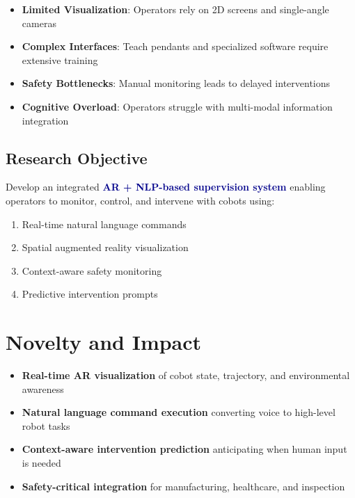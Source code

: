 \documentclass[12pt,a4paper,oneside]{book}
\begin{document}
\begin{itemize}
    \item \textbf{Limited Visualization}: Operators rely on 2D screens and single-angle cameras
    \item \textbf{Complex Interfaces}: Teach pendants and specialized software require extensive training
    \item \textbf{Safety Bottlenecks}: Manual monitoring leads to delayed interventions
    \item \textbf{Cognitive Overload}: Operators struggle with multi-modal information integration
\end{itemize}

\subsection{Research Objective}

Develop an integrated \textcolor{darkblue}{\textbf{AR + NLP-based supervision system}} enabling operators to monitor, control, and intervene with cobots using:
\begin{enumerate}
    \item Real-time natural language commands
    \item Spatial augmented reality visualization
    \item Context-aware safety monitoring
    \item Predictive intervention prompts
\end{enumerate}

\section{Novelty and Impact}

\begin{tcolorbox}[colback=lightblue, colframe=darkblue, title=Key Innovations]
\begin{itemize}
    \item \textbf{Real-time AR visualization} of cobot state, trajectory, and environmental awareness
    \item \textbf{Natural language command execution} converting voice to high-level robot tasks
    \item \textbf{Context-aware intervention prediction} anticipating when human input is needed
    \item \textbf{Safety-critical integration} for manufacturing, healthcare, and inspection
\end{itemize}
\end{tcolorbox}
\end{document}
